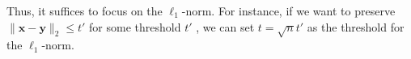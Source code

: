 \documentclass[pdflatex,sn-mathphys-num]{sn-jnl}
\newtheorem{theorem}{Theorem}
\theoremstyle{definition}
\newcommand{\pixel}[1]{\mathsf{#1}}
\newcommand{\vtr}[1]{\mathbf{#1}}
\newcommand{\norm}[1]{\lVert{#1}\rVert}
\begin{document}
Thus, it suffices to focus on the $\ell_1$-norm. For instance, if we want to preserve $\norm{\vtr{x} - \vtr{y}}_2 \leq t'$ for some threshold $t'$ , we can set $t = \sqrt{n}t'$ as the threshold for the $\ell_1$-norm. 
\end{document}
